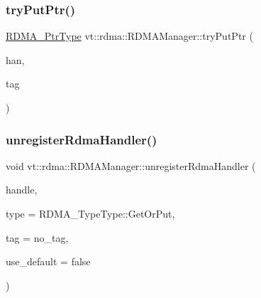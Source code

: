 \mbox{\label{structvt_1_1rdma_1_1_r_d_m_a_manager_afe917ba8c9a44175dd0766f3f0321e61}} 
\subsubsection{\texorpdfstring{try\+Put\+Ptr()}{tryPutPtr()}}
{\footnotesize\ttfamily \hyperlink{namespacevt_a9e2c953286c7616f7c218e9951790776}{R\+D\+M\+A\+\_\+\+Ptr\+Type} vt\+::rdma\+::\+R\+D\+M\+A\+Manager\+::try\+Put\+Ptr (\begin{DoxyParamCaption}\item[{\hyperlink{namespacevt_a10442579ec4e7ebef223818e64bcf908}{R\+D\+M\+A\+\_\+\+Handle\+Type} const \&}]{han,  }\item[{\hyperlink{namespacevt_a84ab281dae04a52a4b243d6bf62d0e52}{Tag\+Type} const \&}]{tag }\end{DoxyParamCaption})\hspace{0.3cm}{\ttfamily [private]}}

\mbox{\label{structvt_1_1rdma_1_1_r_d_m_a_manager_a59de11a7b7a8034a2e8e27a10897ce01}} 
\subsubsection{\texorpdfstring{unregister\+Rdma\+Handler()}{unregisterRdmaHandler()}\hspace{0.1cm}{\footnotesize\ttfamily [1/2]}}
{\footnotesize\ttfamily void vt\+::rdma\+::\+R\+D\+M\+A\+Manager\+::unregister\+Rdma\+Handler (\begin{DoxyParamCaption}\item[{\hyperlink{namespacevt_a10442579ec4e7ebef223818e64bcf908}{R\+D\+M\+A\+\_\+\+Handle\+Type} const \&}]{handle,  }\item[{\hyperlink{namespacevt_1_1rdma_ac848e1d9da43db6294bd06f83e5d3946}{R\+D\+M\+A\+\_\+\+Type\+Type} const \&}]{type = {\ttfamily RDMA\+\_\+TypeType\+:\+:GetOrPut},  }\item[{\hyperlink{namespacevt_a84ab281dae04a52a4b243d6bf62d0e52}{Tag\+Type} const \&}]{tag = {\ttfamily no\+\_\+tag},  }\item[{bool const \&}]{use\+\_\+default = {\ttfamily false} }\end{DoxyParamCaption})}



